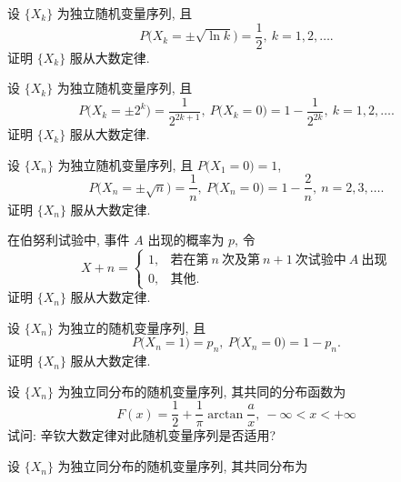 \begin{xiti}
    \item 设 $ \{ X_k \} $ 为独立随机变量序列, 且
    \begin{equation*}
        P \bigl( X_k = \pm \sqrt{\ln k} \bigr) = \frac{1}{2}, \ k = 1, 2, \dotsc.
    \end{equation*}
    证明 $ \{ X_k \} $ 服从大数定律.
    \item 设 $ \{ X_k \} $ 为独立随机变量序列, 且
    \begin{equation*}
        P \bigl( X_k = \pm 2^k \bigr) = \frac{1}{2^{2k+1}}, \ P \bigl( X_k = 0 \bigr) = 1 - \frac{1}{2^{2k}}, \ k = 1, 2, \dotsc .
    \end{equation*}
    证明 $ \{ X_k \} $ 服从大数定律.
    \item 设 $ \{ X_n \} $ 为独立随机变量序列, 且 $ P \bigl( X_1 = 0 \bigr) = 1 $,
    \begin{equation*}
        P \bigl( X_n = \pm \sqrt{n} \bigr) = \frac{1}{n}, \ P \bigl( X_n = 0 \bigr) = 1 - \frac{2}{n}, \ n = 2, 3, \dotsc .
    \end{equation*}
    证明 $ \{ X_n \} $ 服从大数定律.
    \item 在伯努利试验中, 事件 $ A $ 出现的概率为 $ p $, 令
    \begin{equation*}
        X+n =
        \begin{cases}
            1, & \text{若在第} \ n \ \text{次及第} \ n+1 \ \text{次试验中} \ A \ \text{出现}\\
            0, & \text{其他}.
        \end{cases}
    \end{equation*}
    证明 $ \{ X_n \} $ 服从大数定律.
    \item  设 $ \{ X_n \} $ 为独立的随机变量序列, 且
    \begin{equation*}
        P \bigl( X_n = 1 \bigr) = p_n, \ P \bigl( X_n = 0 \bigr) = 1 - p_n.
    \end{equation*}
    证明 $ \{ X_n \} $ 服从大数定律.
    \item 设 $ \{ X_n \} $ 为独立同分布的随机变量序列, 其共同的分布函数为
    \begin{equation*}
        F (x) = \frac{1}{2} + \frac{1}{\pi} \arctan \frac{a}{x}, \ -\infty < x < +\infty
    \end{equation*}
    试问: 辛钦大数定律对此随机变量序列是否适用?
    \item 设 $ \{ X_n \} $ 为独立同分布的随机变量序列, 其共同分布为
    \begin{equation*}

\end{equation*}
\end{xiti}
